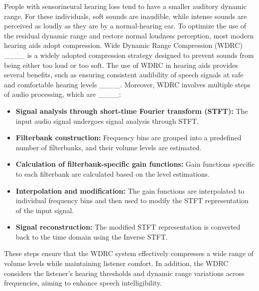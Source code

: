 People with sensorineural hearing loss tend to have a smaller auditory dynamic range. For these individuals, soft sounds are inaudible, while intense sounds are perceived as loudly as they are by a normal-hearing ear. To optimize the use of the residual dynamic range and restore normal loudness perception, most modern hearing aids adopt compression. Wide Dynamic Range Compression (WDRC) ____ is a widely adopted compression strategy designed to prevent sounds from being either too loud or too soft. The use of WDRC in hearing aids provides several benefits, such as ensuring consistent audibility of speech signals at safe and comfortable hearing levels ____. Moreover, WDRC involves multiple steps of audio processing, which are ____:

\begin{itemize}
\item \textbf{Signal analysis through short-time Fourier transform (STFT):} The input audio signal undergoes signal analysis through STFT.

\item \textbf{Filterbank construction:} Frequency bins are grouped into a predefined number of filterbanks, and their volume levels are estimated.

\item \textbf{Calculation of filterbank-specific gain functions:} Gain functions specific to each filterbank are calculated based on the level estimations. 

\item \textbf{Interpolation and modification:} The gain functions are interpolated to individual frequency bins and then used to modify the STFT representation of the input signal. 

\item \textbf{Signal reconstruction:} The modified STFT representation is converted back to the time domain using the Inverse STFT.
\end{itemize}

These steps ensure that the WDRC system effectively compresses a wide range of volume levels while maintaining listener comfort. In addition, the WDRC considers the listener's hearing thresholds and dynamic range variations across frequencies, aiming to enhance speech intelligibility.